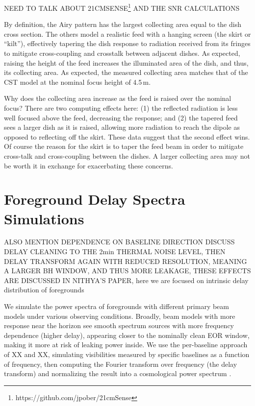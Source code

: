 \documentclass[preprint]{aastex}
\begin{document}
NEED TO TALK ABOUT 21CMSENSE\footnote{https://github.com/jpober/21cmSense} AND THE SNR CALCULATIONS

By definition, the Airy pattern has the largest collecting area equal to the dish cross section. The others model a realistic feed with a hanging screen (the skirt or ``kilt''), effectively tapering the dish response to radiation received from its fringes to mitigate cross-coupling and crosstalk between adjacent dishes. As expected, raising the height of the feed increases the illuminated area of the dish, and thus, its collecting area. As expected, the measured collecting area matches that of the CST model at the nominal focus height of 4.5\,m.

Why does the collecting area increase as the feed is raised over the nominal focus? There are two computing effects here: (1) the reflected radiation is less well focused above the feed, decreasing the response; and (2) the tapered feed sees a larger dish as it is raised, allowing more radiation to reach the dipole as opposed to reflecting off the skirt. These data suggest that the second effect wins. Of course the reason for the skirt is to taper the feed beam in order to mitigate cross-talk and cross-coupling between the dishes. A larger collecting area may not be worth it in exchange for exacerbating these concerns.

\section{Foreground Delay Spectra Simulations}
\label{sec:foregrounds}

ALSO MENTION DEPENDENCE ON BASELINE DIRECTION
DISCUSS DELAY CLEANING TO THE 2min THERMAL NOISE LEVEL, THEN DELAY TRANSFORM AGAIN WITH REDUCED RESOLUTION, MEANING A LARGER BH WINDOW, AND THUS MORE LEAKAGE, THESE EFFECTS ARE DISCUSSED IN NITHYA'S PAPER, here we are focused on intrinsic delay distribution of foregrounds

We simulate the power spectra of foregrounds with different primary beam models under various observing conditions. Broadly, beam models with more response near the horizon see smooth spectrum sources with more frequency dependence (higher delay), appearing closer to the nominally clean EOR window, making it more at risk of leaking power inside. We use the per-baseline approach of XX and XX, simulating visibilities measured by specific baselines as a function of frequency, then computing the Fourier transform over frequency (the delay transform) and normalizing the result into a cosmological power spectrum \citep{perbaselinetechnique}. 
\end{document}
